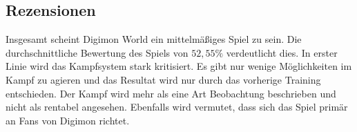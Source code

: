 \subsection{Rezensionen}
Insgesamt scheint Digimon World ein mittelmäßiges Spiel zu sein.
Die durchschnittliche Bewertung des Spiels von $52{,}55\%$ verdeutlicht dies\cite{metacritic-gamerankings}.
In erster Linie wird das Kampfsystem stark kritisiert.
Es gibt nur wenige Möglichkeiten im Kampf zu agieren und das Resultat wird nur durch das vorherige Training entschieden\cite{ign}.
Der Kampf wird mehr als eine Art Beobachtung beschrieben und nicht als rentabel angesehen.
Ebenfalls wird vermutet, dass sich das Spiel primär an Fans von Digimon richtet\cite{gamespot}.
